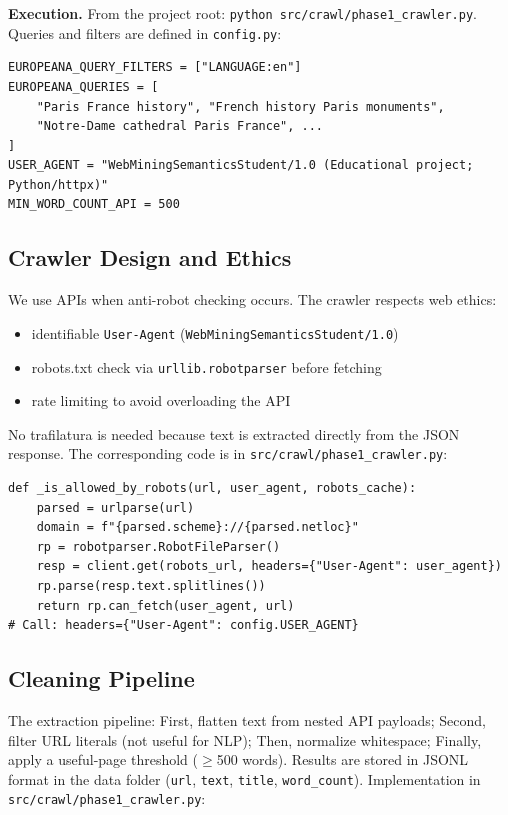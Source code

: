 \documentclass[11pt,a4paper]{article}
\begin{document}
\textbf{Execution.} From the project root: \texttt{python src/crawl/phase1\_crawler.py}. Queries and filters are defined in \texttt{config.py}:

\begin{lstlisting}[caption={\texttt{config.py} (excerpt) -- seeds, language filter, User-Agent}]
EUROPEANA_QUERY_FILTERS = ["LANGUAGE:en"]
EUROPEANA_QUERIES = [
    "Paris France history", "French history Paris monuments",
    "Notre-Dame cathedral Paris France", ...
]
USER_AGENT = "WebMiningSemanticsStudent/1.0 (Educational project; Python/httpx)"
MIN_WORD_COUNT_API = 500
\end{lstlisting}

\subsection{Crawler Design and Ethics}

We use APIs when anti-robot checking occurs. The crawler respects web ethics:
\begin{itemize}
\item identifiable \texttt{User-Agent} (\texttt{WebMiningSemanticsStudent/1.0})
\item robots.txt check via \texttt{urllib.robotparser} before fetching
\item rate limiting to avoid overloading the API
\end{itemize}
No trafilatura is needed because text is extracted directly from the JSON response. The corresponding code is in \texttt{src/crawl/phase1\_crawler.py}:

\begin{lstlisting}[caption={\texttt{src/crawl/phase1\_crawler.py} -- robots.txt and User-Agent}]
def _is_allowed_by_robots(url, user_agent, robots_cache):
    parsed = urlparse(url)
    domain = f"{parsed.scheme}://{parsed.netloc}"
    rp = robotparser.RobotFileParser()
    resp = client.get(robots_url, headers={"User-Agent": user_agent})
    rp.parse(resp.text.splitlines())
    return rp.can_fetch(user_agent, url)
# Call: headers={"User-Agent": config.USER_AGENT}
\end{lstlisting}

\subsection{Cleaning Pipeline}

The extraction pipeline: First, flatten text from nested API payloads; Second, filter URL literals (not useful for NLP); Then, normalize whitespace; Finally, apply a useful-page threshold ($\geq$500 words). Results are stored in JSONL format in the data folder (\texttt{url}, \texttt{text}, \texttt{title}, \texttt{word\_count}). Implementation in \texttt{src/crawl/phase1\_crawler.py}:
\end{document}
